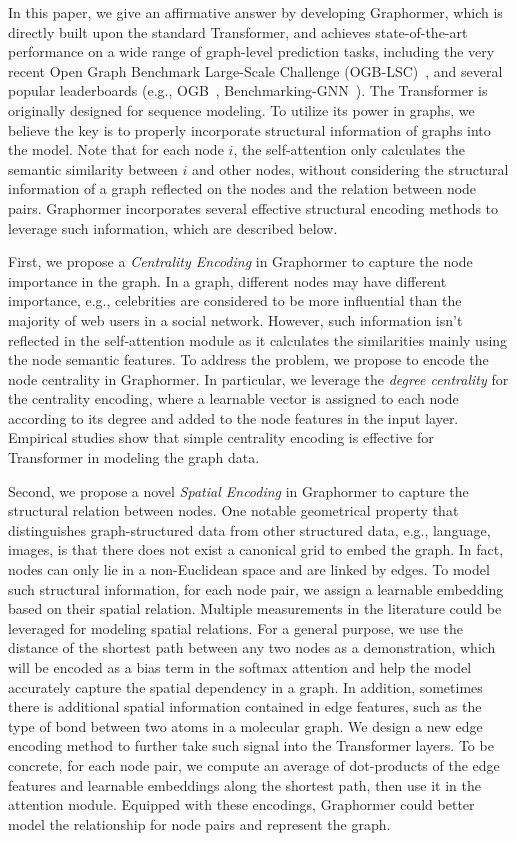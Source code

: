 \documentclass{article}
\begin{document}
In this paper, we give an affirmative answer by developing Graphormer, which is directly built upon the standard Transformer, and achieves state-of-the-art performance on a wide range of graph-level prediction tasks, including the very recent Open Graph Benchmark Large-Scale Challenge (OGB-LSC)~\cite{hu2021ogb}, and several popular leaderboards (e.g., OGB~\cite{hu2020open}, Benchmarking-GNN~\cite{dwivedi2020benchmarking}). The Transformer is originally designed for sequence modeling. To utilize its power in graphs, we believe the key is to properly incorporate structural information of graphs into the model. Note that for each node $i$, the self-attention only calculates the semantic similarity between $i$ and other nodes, without considering the structural information of a graph reflected on the nodes and the relation between node pairs. Graphormer incorporates several effective structural encoding methods to leverage such information, which are described below.


First, we propose a \emph{Centrality Encoding} in Graphormer to capture the node importance in the graph. In a graph, different nodes may have different importance, e.g., celebrities are considered to be more influential than the majority of web users in a social network. However, such information isn't reflected in the self-attention module as it calculates the similarities mainly using the node semantic features. To address the problem, we propose to encode the node centrality in Graphormer. In particular, we leverage the \emph{degree centrality} for the centrality encoding, where a learnable vector is assigned to each node according to its degree and added to the node features in the input layer. Empirical studies show that simple centrality encoding is effective for Transformer in modeling the graph data.

Second, we propose a novel \emph{Spatial Encoding} in Graphormer to capture the structural relation between nodes. One notable geometrical property that distinguishes graph-structured data from other structured data, e.g., language, images, is that there does not exist a canonical grid to embed the graph. In fact, nodes can only lie in a non-Euclidean space and are linked by edges. To model such structural information, for each node pair, we assign a learnable embedding based on their spatial relation. Multiple measurements in the literature could be leveraged for modeling spatial relations. For a general purpose, we use the distance of the shortest path between any two nodes as a demonstration, which will be encoded as a bias term in the softmax attention and help the model accurately capture the spatial dependency in a graph. In addition, sometimes there is additional spatial information contained in edge features, such as the type of bond between two atoms in a molecular graph. We design a new edge encoding method to further take such signal into the Transformer layers. To be concrete, for each node pair, we compute an average of dot-products of the edge features and learnable embeddings along the shortest path, then use it in the attention module. Equipped with these encodings, Graphormer could better model the relationship for node pairs and represent the graph.
\end{document}
